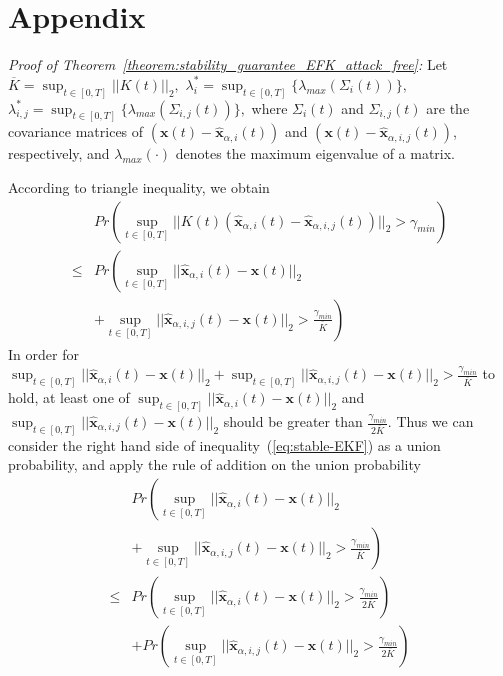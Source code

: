 \documentclass[journal]{IEEEtran}
\begin{document}
\section{Appendix}
\label{sec:appendix}
\textit{Proof of Theorem~\ref{theorem:stability_guarantee_EFK_attack_free}: }
Let $\overline{K} = \sup_{t \in [0,T]} ||K(t)||_2,$ $\lambda_i^{\ast} = \sup_{t \in [0,T]}{\{\lambda_{max}(\Sigma_i(t))\}},$ $\lambda_{i,j}^{\ast} = \sup_{t \in [0,T]}{\{\lambda_{max}(\Sigma_{i,j}(t))\}},$
where $\Sigma_i(t)$ and $\Sigma_{i,j}(t)$ are the covariance matrices of $(\mathbf{x}(t)-\hat{\mathbf{x}}_{\alpha,i}(t))$ and $(\mathbf{x}(t)-\hat{\mathbf{x}}_{\alpha,i,j}(t))$, respectively, and $\lambda_{max}(\cdot)$ denotes the maximum eigenvalue of a matrix.

According to triangle inequality, we obtain
\begin{equation*}
\label{eq:stable-EKF}
    \begin{array}{ll}
        &Pr\left(\sup_{t \in [0,T]} ||K(t)(\mathbf{\hat{x}}_{\alpha,i}(t)-\mathbf{\hat{x}}_{\alpha,i,j}(t))||_2 > \gamma_{min} \right) \\
        \leq &Pr\left(\sup_{t \in [0,T]} ||\mathbf{\hat{x}}_{\alpha,i}(t)-\mathbf{x}(t)||_2 \right.\\
        &\left.+ \sup_{t \in [0,T]} ||\mathbf{\hat{x}}_{\alpha,i,j}(t)-\mathbf{x}(t)||_2 > \frac{\gamma_{min}}{\overline{K}} \right)
    \end{array}
\end{equation*}
In order for $\sup_{t \in [0,T]} ||\mathbf{\hat{x}}_{\alpha,i}(t)-\mathbf{x}(t)||_2 + \sup_{t \in [0,T]} ||\mathbf{\hat{x}}_{\alpha,i,j}(t)-\mathbf{x}(t)||_2 > \frac{\gamma_{min}}{\overline{K}}$ to hold, at least one of $\sup_{t \in [0,T]} ||\mathbf{\hat{x}}_{\alpha,i}(t)-\mathbf{x}(t)||_2$ and $\sup_{t \in [0,T]} ||\mathbf{\hat{x}}_{\alpha,i,j}(t)-\mathbf{x}(t)||_2$ should be greater than $\frac{\gamma_{min}}{2\overline{K}}.$ Thus we can consider the right hand side of inequality~(\ref{eq:stable-EKF}) as a union probability, and apply the rule of addition on the union probability
\begin{equation}
    \begin{array}{ll}
        &Pr\left(\sup_{t \in [0,T]} ||\mathbf{\hat{x}}_{\alpha,i}(t)-\mathbf{x}(t)||_2 \right.\\
        &\left.+ \sup_{t \in [0,T]} ||\mathbf{\hat{x}}_{\alpha,i,j}(t)-\mathbf{x}(t)||_2 > \frac{\gamma_{min}}{\overline{K}} \right) \\
        \leq &Pr\left(\sup_{t \in [0,T]} ||\mathbf{\hat{x}}_{\alpha,i}(t)-\mathbf{x}(t)||_2 > \frac{\gamma_{min}}{2\overline{K}}\right) \\
        &+ Pr\left(\sup_{t \in [0,T]} ||\mathbf{\hat{x}}_{\alpha,i,j}(t)-\mathbf{x}(t)||_2 > \frac{\gamma_{min}}{2\overline{K}}\right)
    \end{array}
\end{equation}
\end{document}
